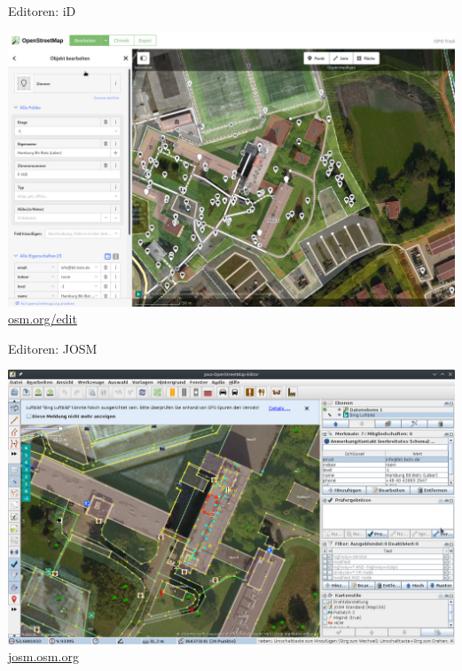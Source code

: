 \documentclass{beamer}
\begin{document}
			\begin{frame}{Editoren: iD}
				\begin{center}
					\includegraphics[height=0.75\textheight]{images/id-editor.jpg}
					\href{https://www.openstreetmap.org/edit}{osm.org/edit}
				\end{center}
			\end{frame}
			
			\begin{frame}{Editoren: JOSM}
				\begin{center}
					\includegraphics[height=0.75\textheight]{images/josm-editor.jpg}
					\href{https://josm.openstreetmap.de/}{josm.osm.org}
				\end{center}
			\end{frame}
			
\end{document}
